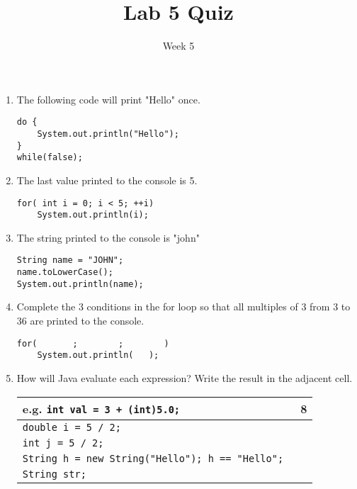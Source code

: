 \documentclass[addpoints]{exam}
\title{Lab 5 Quiz}
\date{Week 5}
\begin{document}
 

\Instructions
\begin{enumerate}
\newline

 \item {} \tf
The following code will print "Hello" once.
\begin{lstlisting}
do {
    System.out.println("Hello");
}
while(false);
\end{lstlisting}

 \item {} \tf
The last value printed to the console is 5.
\begin{lstlisting}
for( int i = 0; i < 5; ++i)
    System.out.println(i);
\end{lstlisting}

 \item {} \tf
The string printed to the console is "john"
\begin{lstlisting}
String name = "JOHN";
name.toLowerCase();
System.out.println(name);
\end{lstlisting}


\item {} 
Complete the 3 conditions in the for loop so that all multiples of 3 from 3 to 36 are printed to the console.

\begin{lstlisting}
for(       ;        ;        )
    System.out.println(   );
\end{lstlisting}


\ifdraft \clearpage \fi
\item {} How will Java evaluate each expression? Write the result in the adjacent cell.
\begin{table}[!htb]
\setlength{\tabcolsep}{3em}
\centering	
\renewcommand{\arraystretch}{1.6}
\begin{tabular}{|l|l| } \hline
\textbf{e.g.} \texttt{int val = 3 + (int)5.0;
}& \textbf{8} \\ \hline

\texttt{double i = 5 / 2;} &     \\ \hline

\texttt{int j = 5 / 2;}&   \\ \hline

\texttt{String h = new String("Hello"); h == "Hello"; }&    \\ \hline

\texttt{String str;}&    \\ \hline
\end{tabular}
\end{table}
\end{enumerate}
\end{document}
